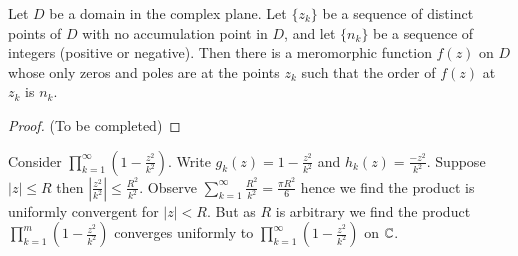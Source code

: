 \begin{theorem}
    Let $D$ be a domain in the complex plane. Let $\{z_k\}$ be a sequence of distinct points of $D$ with no accumulation point in $D$, and let $\{n_k\}$ be a sequence of integers (positive or negative). Then there is a meromorphic function $f(z)$ on $D$ whose only zeros and poles are at the points $z_k$ such that the order of $f(z)$ at $z_k$ is $n_k$.
\end{theorem}
\begin{proof}
    (To be completed)
\end{proof}

\begin{example}
    Consider $\prod_{k=1}^{\infty}\left(1-\frac{z^2}{k^2}\right)$. Write $g_k(z) = 1-\frac{z^2}{k^2}$ and $h_k(z) = \frac{-z^2}{k^2}$. Suppose $|z| \leq R$ then $\left|\frac{z^2}{k^2}\right| \leq \frac{R^2}{k^2}$. Observe $\sum_{k=1}^{\infty}\frac{R^2}{k^2} = \frac{\pi R^2}{6}$ hence we find the product is uniformly convergent for $|z| < R$. But as $R$ is arbitrary we find the product $\prod_{k=1}^{m}\left(1-\frac{z^2}{k^2}\right)$ converges uniformly to $\prod_{k=1}^{\infty}\left(1-\frac{z^2}{k^2}\right)$ on $\mathbb C$.
\end{example}





